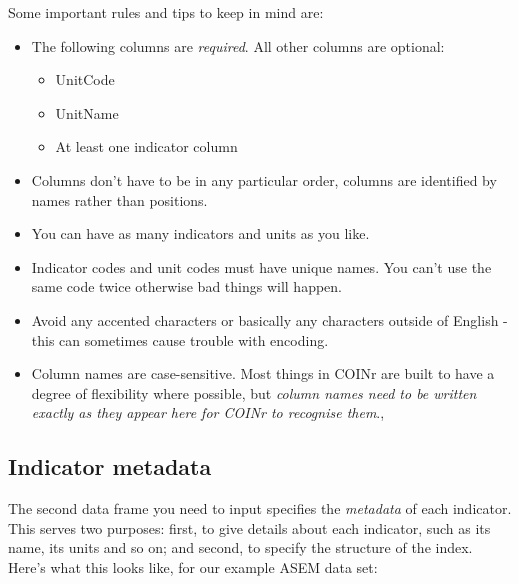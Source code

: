 \documentclass[
]{book}
\providecommand{\tightlist}{%
  \setlength{\itemsep}{0pt}\setlength{\parskip}{0pt}}
\begin{document}
Some important rules and tips to keep in mind are:

\begin{itemize}
\tightlist
\item
  The following columns are \emph{required}. All other columns are optional:

  \begin{itemize}
  \tightlist
  \item
    UnitCode
  \item
    UnitName
  \item
    At least one indicator column
  \end{itemize}
\item
  Columns don't have to be in any particular order, columns are identified by names rather than positions.
\item
  You can have as many indicators and units as you like.
\item
  Indicator codes and unit codes must have unique names. You can't use the same code twice otherwise bad things will happen.
\item
  Avoid any accented characters or basically any characters outside of English - this can sometimes cause trouble with encoding.
\item
  Column names are case-sensitive. Most things in COINr are built to have a degree of flexibility where possible, but \emph{column names need to be written exactly as they appear here for COINr to recognise them}.,
\end{itemize}

\hypertarget{indicator-metadata}{%
\subsection{Indicator metadata}\label{indicator-metadata}}

The second data frame you need to input specifies the \emph{metadata} of each indicator. This serves two purposes: first, to give details about each indicator, such as its name, its units and so on; and second, to specify the structure of the index. Here's what this looks like, for our example ASEM data set:
\end{document}
